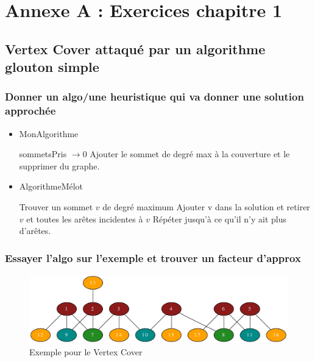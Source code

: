 \documentclass[12pt]{article}
\begin{document}
\section{Annexe A : Exercices chapitre 1}\label{exochap1}

\subsection{Vertex Cover attaqué par un algorithme glouton simple}

\subsubsection*{Donner un algo/une heuristique qui va donner une solution approchée}

\begin{itemize}
\item[]
\begin{algorithm}[h!]
\caption{MonAlgorithme}
\begin{algorithmic}[1]
\STATE sommetsPris $\rightarrow 0$
\STATE Ajouter le sommet de degré max à la couverture et le supprimer du graphe.
\ENDWHILE
\end{algorithmic}
\end{algorithm}
\item[]
\begin{algorithm}[h!]
\caption{AlgorithmeMélot}
\begin{algorithmic}[1]
\STATE Trouver un sommet $v$ de degré maximum
\STATE Ajouter v dans la solution et retirer $v$ et toutes les arêtes incidentes à $v$
\STATE Répéter jusqu'à ce qu'il n'y ait plus d'arêtes.
\end{algorithmic}
\end{algorithm}
\end{itemize}

\subsubsection*{Essayer l'algo sur l'exemple et trouver un facteur d'approx}

\begin{figure}[h!]
    \begin{center}
    \includegraphics[width=\textwidth]{exo_1_5.pdf}
    \caption{Exemple pour le Vertex Cover}
    \end{center}
\end{figure}
\end{document}
